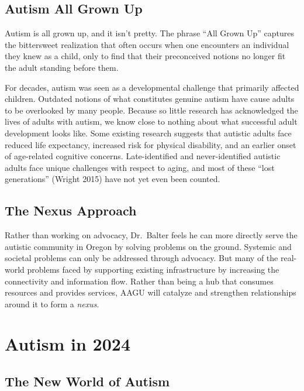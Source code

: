 \documentclass[
  letterpaper,
  DIV=11,
  numbers=noendperiod]{scrreprt}
\begin{document}
\hypertarget{sec-ex_name}{%
\section{Autism All Grown Up}\label{sec-ex_name}}

Autism is all grown up, and it isn't pretty. The phrase ``All Grown Up''
captures the bittersweet realization that often occurs when one
encounters an individual they knew as a child, only to find that their
preconceived notions no longer fit the adult standing before them.

For decades, autism was seen as a developmental challenge that primarily
affected children. Outdated notions of what constitutes genuine autism
have cause adults to be overlooked by many people. Because so little
research has acknowledged the lives of adults with autism, we know close
to nothing about what successful adult development looks like. Some
existing research suggests that autistic adults face reduced life
expectancy, increased risk for physical disability, and an earlier onset
of age-related cognitive concerns. Late-identified and never-identified
autistic adults face unique challenges with respect to aging, and most
of these ``lost generations'' (Wright 2015) have not yet even been
counted.

\hypertarget{sec-ex_sum_nexus}{%
\section{The Nexus Approach}\label{sec-ex_sum_nexus}}

Rather than working on advocacy, Dr.~Balter feels he can more directly
serve the autistic community in Oregon by solving problems on the
ground. Systemic and societal problems can only be addressed through
advocacy. But many of the real-world problems faced by supporting
existing infrastructure by increasing the connectivity and information
flow. Rather than being a hub that consumes resources and provides
services, AAGU will catalyze and strengthen relationships around it to
form a \emph{nexus}.


\hypertarget{sec-autism2024}{%
\chapter{Autism in 2024}\label{sec-autism2024}}

\hypertarget{the-new-world-of-autism}{%
\section{The New World of Autism}\label{the-new-world-of-autism}}
\end{document}

